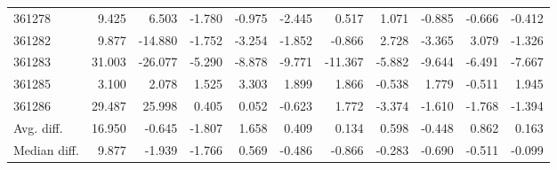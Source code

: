 \begin{tabular}{lrrrrrrrrrr}
361278 & 9.425 & 6.503 & -1.780 & -0.975 & -2.445 & 0.517 & 1.071 & -0.885 & -0.666 & -0.412 \\
361282 & 9.877 & -14.880 & -1.752 & -3.254 & -1.852 & -0.866 & 2.728 & -3.365 & 3.079 & -1.326 \\
361283 & 31.003 & -26.077 & -5.290 & -8.878 & -9.771 & -11.367 & -5.882 & -9.644 & -6.491 & -7.667 \\
361285 & 3.100 & 2.078 & 1.525 & 3.303 & 1.899 & 1.866 & -0.538 & 1.779 & -0.511 & 1.945 \\
361286 & 29.487 & 25.998 & 0.405 & 0.052 & -0.623 & 1.772 & -3.374 & -1.610 & -1.768 & -1.394 \\
Avg. diff. & 16.950 & -0.645 & -1.807 & 1.658 & 0.409 & 0.134 & 0.598 & -0.448 & 0.862 & 0.163 \\
Median diff. & 9.877 & -1.939 & -1.766 & 0.569 & -0.486 & -0.866 & -0.283 & -0.690 & -0.511 & -0.099 \\
\bottomrule
\end{tabular}
